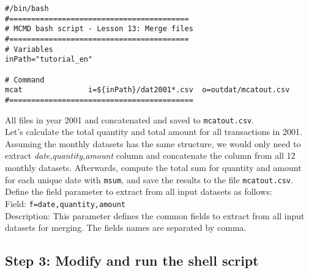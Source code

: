 \begin{verbatim}
#/bin/bash
#=========================================
# MCMD bash script - Lesson 13: Merge files
#=========================================
# Variables
inPath="tutorial_en"

# Command 
mcat               i=${inPath}/dat2001*.csv  o=outdat/mcatout.csv
#==========================================
\end{verbatim}

All files in year 2001 and concatenated and saved to \verb|mcatout.csv|.  \\

Let's calculate the total quantity and total amount for all transactions in 2001. Assuming the monthly datasets has the same structure, we would only need to extract \emph{date,quantity,amount} column and concatenate the column from all 12 monthly datasets. Afterwards, compute the total sum for quantity and amount for each unique date with \verb|msum|, and save the results to the file \verb|mcatout.csv|.  \\

Define the field parameter to extract from all input datasets as follows: \\

Field: 		\verb|f=date,quantity,amount| \\
Description: 	This parameter defines the common fields to extract from all input datasets for merging. The fields names are separated by comma. 

 \subsection{Step 3: Modify and run the shell script}
 
